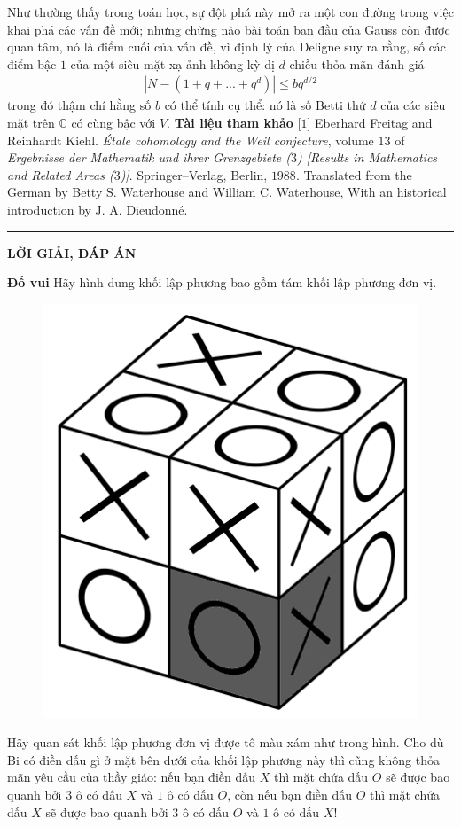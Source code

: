 \begin{multicols}{2}
	\vskip 0.1cm
	Như thường thấy trong toán học, sự đột phá này mở ra một con đường trong việc khai phá các vấn đề mới; nhưng chừng nào bài toán ban đầu của Gauss còn được quan tâm, nó là điểm cuối của vấn đề, vì định lý của Deligne suy ra rằng, số các điểm bậc $1$ của một siêu mặt xạ ảnh không kỳ dị $d$ chiều thỏa mãn đánh giá
	\begin{align*} 
		\left| N - (1 + q+...+q^d )\right| \leq bq^{d/2}
	\end{align*}
	trong đó thậm chí hằng số $b$ có thể tính cụ thể: nó là số Betti thứ $d$ của các siêu mặt trên $\mathbb{C}$ có cùng bậc với $V$.
	\vskip 0.1cm
	\textbf{\color{duongvaotoanhoc}Tài liệu tham khảo}
	\vskip 0.1cm
	[$1$] Eberhard Freitag and Reinhardt Kiehl. \textit{Étale cohomology and the Weil conjecture}, volume $13$ of \textit{Ergebnisse der Mathematik und ihrer Grenzgebiete ($3$) [Results in Mathematics and Related
	Areas ($3$)]}. Springer--Verlag, Berlin, $1988$. Translated from the German by Betty S. Waterhouse and William C. Waterhouse, With an historical introduction by J. A. Dieudonné.
\end{multicols}
\vspace*{-10pt}
{\rule{1\linewidth}{0.1pt}}
\vskip 0.25cm
\centerline{\LARGE\textbf{\color{duongvaotoanhoc}LỜI GIẢI, ĐÁP ÁN}}
\begin{multicols}{2}
		\textbf{\color{duongvaotoanhoc}Đố vui}
		\vskip 0.1cm
		Hãy hình dung khối lập phương bao gồm tám khối lập phương đơn vị.
		\begin{figure}[H]
				\vspace*{-10pt}
				\centering
				\captionsetup{labelformat= empty, justification=centering}
				\includegraphics[width= 0.65\linewidth]{lgdovui}
				\vspace*{-5pt}
			\end{figure}
		Hãy quan sát khối lập phương đơn vị được tô màu xám như trong hình. Cho dù Bi có điền dấu gì ở mặt bên dưới của khối lập phương này thì cũng không thỏa mãn yêu cầu của thầy giáo: nếu bạn điền dấu $X$ thì mặt chứa dấu $O$ sẽ được bao quanh bởi $3$ ô có dấu $X$ và $1$ ô có dấu $O$, còn nếu bạn điền dấu $O$ thì mặt chứa dấu $X$ sẽ được bao quanh bởi $3$ ô có dấu $O$ và $1$ ô có dấu $X$!
\end{multicols}
